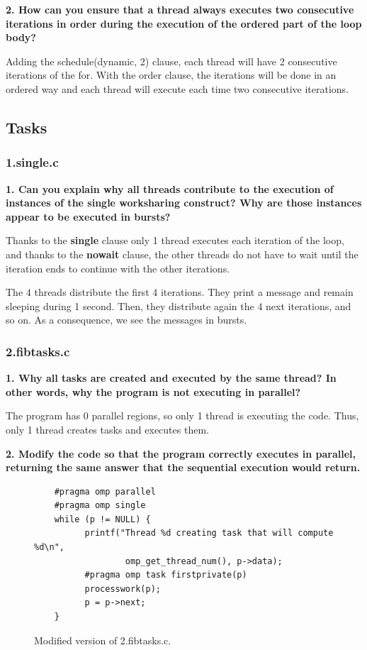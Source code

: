 \documentclass[12pt, a4paper]{article}
\begin{document}
\hfill

\textbf{2. How can you ensure that a thread always executes two consecutive iterations in order during
the execution of the ordered part of the loop body?}

Adding the schedule(dynamic, 2) clause, each thread will have 2 consecutive iterations of the for. With the order clause, the iterations will be done in an ordered way and each thread will execute each time two consecutive iterations.

\subsection{Tasks}

\subsubsection{1.single.c}

\textbf{1. Can you explain why all threads contribute to the execution of instances of the single worksharing construct? Why are those instances appear to be executed in bursts?}

Thanks to the \textbf{single} clause only 1 thread executes each iteration of the loop, and thanks to the \textbf{nowait} clause, the other threads do not have to wait until the iteration ends to continue with the other iterations.

The 4 threads distribute the first 4 iterations. They print a message and remain sleeping during 1 second. Then, they distribute again the 4 next iterations, and so on. As a consequence, we see the messages in bursts.

\subsubsection{2.fibtasks.c}

\textbf{1. Why all tasks are created and executed by the same thread? In other words, why the program is not executing in parallel?}

The program has 0 parallel regions, so only 1 thread is executing the code. Thus, only 1 thread creates tasks and executes them.

\hfill

\textbf{2. Modify the code so that the program correctly executes in parallel, returning the same answer that the sequential execution would return.}

\begin{figure}[H]
	\begin{lstlisting}
	#pragma omp parallel
    #pragma omp single
    while (p != NULL) {
          printf("Thread %d creating task that will compute %d\n",
          		  omp_get_thread_num(), p->data);
          #pragma omp task firstprivate(p)
          processwork(p);
          p = p->next;
    }
	\end{lstlisting}
	\caption{Modified version of 2.fibtasks.c.}
\end{figure}
\end{document}

